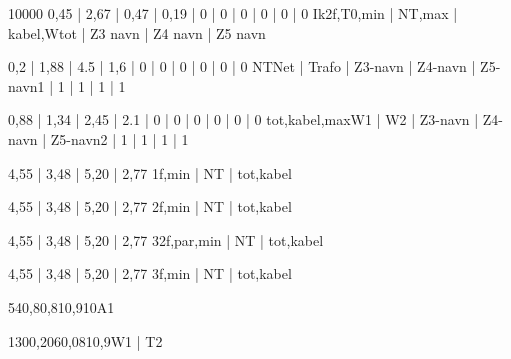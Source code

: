 \documentclass[a4paper,oneside,10pt,danish]{report}
\begin{document}
\begin{HV-ZtilIk2f}{10000}{ 0,45 | 2,67 | 0,47 | 0,19 | 0 | 0 | 0 | 0 | 0 | 0 }{Ik2f,T0,min | NT,max | kabel,Wtot | Z3 navn | Z4 navn | Z5 navn}
\end{HV-ZtilIk2f}

\begin{Ztotal}{ 0,2 | 1,88 | 4.5 | 1,6 | 0 | 0 | 0 | 0 | 0 | 0 }{NT}{Net | Trafo | Z3-navn | Z4-navn | Z5-navn}{1 | 1 | 1 | 1 | 1}
\end{Ztotal}

\begin{LV-Ztotal-max}{ 0,88 | 1,34 | 2,45 | 2.1 | 0 | 0 | 0 | 0 | 0 | 0 }{tot,kabel,max}{W1 | W2 | Z3-navn | Z4-navn | Z5-navn}{2 | 1 | 1 | 1 | 1}
\end{LV-Ztotal-max}

\begin{LV-Ik1f-kA}{ 4,55 | 3,48 | 5,20 | 2,77 }{1f,min | NT | tot,kabel}
\end{LV-Ik1f-kA}

\begin{LV-Ik2f-kA}{ 4,55 | 3,48 | 5,20 | 2,77 }{2f,min | NT | tot,kabel}
\end{LV-Ik2f-kA}

\begin{LV-Ik2f,parSikr-kA}{ 4,55 | 3,48 | 5,20 | 2,77 }{3}{2f,par,min | NT | tot,kabel}
\end{LV-Ik2f,parSikr-kA}

\begin{LV-Ik3f-kA}{ 4,55 | 3,48 | 5,20 | 2,77 }{3f,min | NT | tot,kabel}
\end{LV-Ik3f-kA}

\begin{faseKOMP-Iny}{540,8}{0,81}{0,9}{10}{A1}
\end{faseKOMP-Iny}

\begin{HV-deltaUnet}{130}{0,206}{0,081}{0,9}{W1 | T2}
\end{HV-deltaUnet}
\end{document}
